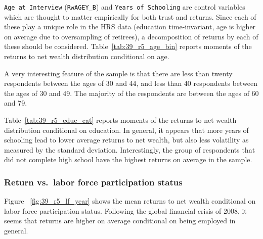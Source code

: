 \par \texttt{Age at Interview} (\texttt{RwAGEY\_B}) and \texttt{Years of Schooling} are control variables which are thought to matter empirically for both trust and returns. Since each of these play a unique role in the HRS data (education time-invariant, age is higher on average due to oversampling of retirees), a decomposition of returns by each of these should be considered. Table~\ref{tab:39_r5_age_bin} reports moments of the returns to net wealth distribution conditional on age. 

\FloatBarrier

\par A very interesting feature of the sample is that there are less than twenty respondents between the ages of 30 and 44, and less than 40 respondents between the ages of 30 and 49. The majority of the respondents are between the ages of 60 and 79.

\par Table~\ref{tab:39_r5_educ_cat} reports moments of the returns to net wealth distribution conditional on education. In general, it appears that more years of schooling lead to lower average returns to net wealth, but also less volatility as measured by the standard deviation. Interestingly, the group of respondents that did not complete high school have the highest returns on average in the sample. 

\FloatBarrier

\subsubsection{Return vs.\ labor force participation status}

\par Figure ~\ref{fig:39_r5_lf_year} shows the mean returns to net wealth conditional on labor force participation status. Following the global financial crisis of 2008, it seems that returns are higher on average conditional on being employed in general. 

